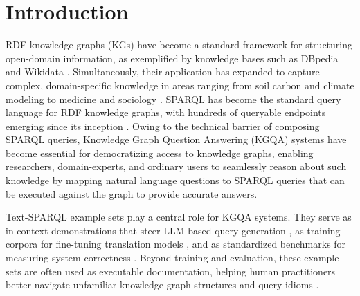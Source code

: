 \section{Introduction}
\label{sec:introduction}
RDF knowledge graphs (KGs) have become a standard framework for structuring open-domain information, as exemplified by knowledge bases such as DBpedia and Wikidata \cite{auer2007dbpedia, vrandecic2014wikidata}. Simultaneously, their application has expanded to capture complex, domain-specific knowledge in areas ranging from soil carbon and climate modeling to medicine and sociology \cite{frink_proto-okn}. SPARQL has become the standard query language for RDF knowledge graphs, with hundreds of queryable endpoints emerging since its inception \cite{ali2022survey}. Owing to the technical barrier of composing SPARQL queries, Knowledge Graph Question Answering (KGQA) systems have become essential for democratizing access to knowledge graphs, enabling researchers, domain-experts, and ordinary users to seamlessly reason about such knowledge by mapping natural language questions to SPARQL queries that can be executed against the graph to provide accurate answers. 

Text-SPARQL example sets play a central role for KGQA systems. They serve as in-context demonstrations that steer LLM-based query generation \cite{wikisp2023,zahera2024generating, dabramo-etal-2025-investigating,emonet2024llm}, as training corpora for fine-tuning translation models \cite{sgpt2022generative,neural2022machine}, and as standardized benchmarks for measuring system correctness \cite{dubey2019lcquad, usbeck2019qald,usbeck2021qald}. Beyond training and evaluation, these example sets are often used as executable documentation, helping human practitioners better navigate unfamiliar knowledge graph structures and query idioms \cite{uniprot_sparql_examples, wikidata_sparql_examples}.

